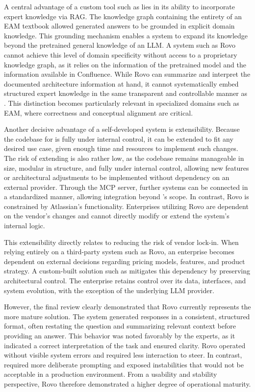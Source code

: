 A central advantage of a custom tool such as \prototype{} lies in its ability to incorporate expert knowledge via RAG. The knowledge graph containing the entirety of an EAM textbook allowed generated answers to be grounded  in explicit domain knowledge. This grounding mechanism enables a system to expand its knowledge beyond the pretrained general knowledge of an LLM. A system such as Rovo cannot achieve this level of domain specificity without access to a proprietary knowledge graph, as it relies on the information of the pretrained model and the information available in Confluence. While Rovo can summarize and interpret the documented architecture information at hand, it cannot systematically embed structured expert knowledge in the same transparent and controllable manner as \prototype{}. This distinction becomes particularly relevant in specialized domains such as EAM, where correctness and conceptual alignment are critical.

Another decisive advantage of a self-developed system is extensibility. Because the codebase for \prototype{} is fully under internal control, it can be extended to fit any desired use case, given enough time and resources to implement such changes. The risk of extending \prototype{} is also rather low, as the codebase remains manageable in size, modular in structure, and fully under internal control, allowing new features or architectural adjustments to be implemented without dependency on an external provider. Through the MCP server, further systems can be connected in a standardized manner, allowing integration beyond \prototype{}'s scope. In contrast, Rovo is constrained by Atlassian's functionality. Enterprises utilizing Rovo are dependent on the vendor's changes and cannot directly modify or extend the system's internal logic.

This extensibility directly relates to reducing the risk of vendor lock-in. When relying entirely on a third-party system such as Rovo, an enterprise becomes dependent on external decisions regarding pricing models, features, and product strategy. A custom-built solution such as \prototype{} mitigates this dependency by preserving architectural control. The enterprise retains control over its data, interfaces, and system evolution, with the exception of the underlying LLM provider.

However, the final review clearly demonstrated that Rovo currently represents the more mature solution. The system generated responses in a consistent, structured format, often restating the question and summarizing relevant context before providing an answer. This behavior was noted favorably by the experts, as it indicated a correct interpretation of the task and ensured clarity. Rovo operated without visible system errors and required less interaction to steer. In contrast, \prototype{} required more deliberate prompting and exposed instabilities that would not be acceptable in a production environment. From a usability and stability perspective, Rovo therefore demonstrated a higher degree of operational maturity.

